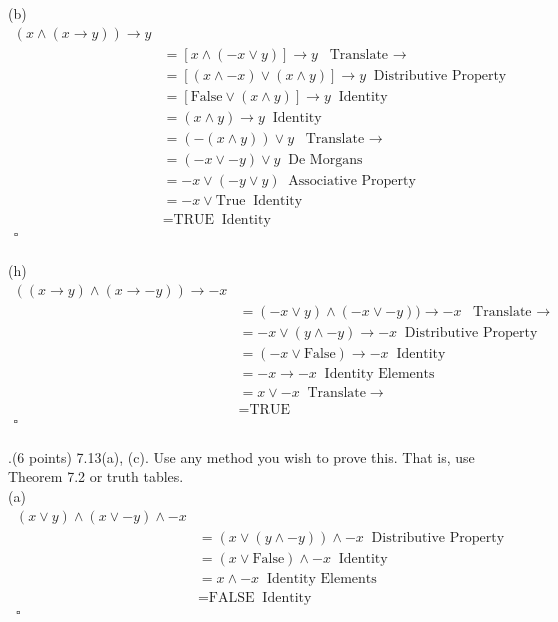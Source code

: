 \documentclass[12pt]{article}
\begin{document}
\vspace{0.25in}
(b)
\[
\begin{aligned} 
(x \wedge (x \rightarrow y)) \rightarrow y \\
&= [x \wedge (-x \vee y)] \rightarrow y \;\;  \mbox{Translate $\rightarrow$} \\
&= [(x \wedge -x) \vee (x \wedge y)] \rightarrow y \;\; \mbox{Distributive Property}\\ 
&= [\mbox{False} \vee (x \wedge y)] \rightarrow y \;\; \mbox{Identity}\\
&= (x \wedge y) \rightarrow y \;\; \mbox{Identity} \\ 
&= (-(x \wedge y)) \vee y \;\; \mbox{Translate $\rightarrow$} \\
&= (-x \vee -y ) \vee y \;\; \mbox{De Morgans}\\
&= -x \vee (-y \vee y) \;\; \mbox{Associative Property} \\
&= -x \vee \mbox{True} \;\; \mbox{Identity}\\
&= \mbox{TRUE} \;\; \mbox{Identity} \\
\square \\
\end{aligned}
\]
 \vspace{0.25in}

(h) 
\[
\begin{aligned} 
((x \rightarrow y) \wedge (x \rightarrow -y)) \rightarrow -x \\
&= (-x \vee y) \wedge (-x \vee -y)) \rightarrow -x \;\;  \mbox{Translate $\rightarrow$} \\
&= -x \vee (y \wedge -y) \rightarrow -x  \;\; \mbox{Distributive Property}\\ 
&= (-x \vee \mbox{False} ) \rightarrow -x \;\; \mbox{Identity}\\
&= -x \rightarrow -x \;\; \mbox{Identity Elements} \\
&= x \vee -x \;\; \mbox{Translate} \rightarrow\\
&= \mbox{TRUE} \\
\square \\
\end{aligned}
\]

.(6 points) 7.13(a), (c).   Use any method you wish to prove this.  That is, use Theorem 7.2 or truth tables.   
\vspace{.05in} \\
(a) 
\[
\begin{aligned} 
(x \vee y) \wedge (x \vee -y) \wedge -x \\
&= (x \vee (y \wedge -y)) \wedge -x \;\;  \mbox{Distributive Property} \\
&= (x \vee \mbox{False} ) \wedge -x  \;\; \mbox{Identity} \\ 
&= x \wedge -x \;\; \mbox{Identity Elements} \\
&= \mbox{FALSE} \;\; \mbox{Identity}\\
\square \\
\end{aligned}
\]
\end{document}
